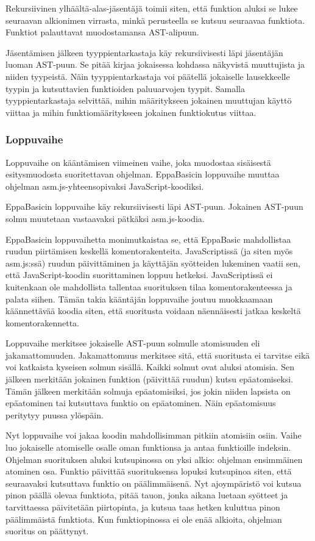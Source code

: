 Rekursiivinen ylhäältä-alas-jäsentäjä
toimii siten, että funktion aluksi
se lukee seuraavan alkionimen virrasta,
minkä perusteella se kutsuu seuraavaa
funktiota.
Funktiot palauttavat muodostamansa
AST-alipuun.

Jäsentämisen jälkeen tyyppientarkastaja
käy rekursiivisesti läpi jäsentäjän
luoman AST-puun.
Se pitää kirjaa jokaisessa kohdassa
näkyvistä muuttujista ja niiden tyypeistä.
Näin tyyppientarkastaja voi päätellä
jokaiselle lausekkeelle tyypin
ja kutsuttavien funktioiden
paluuarvojen tyypit.
Samalla tyyppientarkastaja selvittää,
mihin määritykseen jokainen muuttujan
käyttö viittaa ja mihin funktiomääritykseen
jokainen funktiokutus viittaa.

\subsubsection{Loppuvaihe}
Loppuvaihe on kääntämisen viimeinen vaihe,
joka muodostaa sisäisestä esitysmuodosta
suoritettavan ohjelman.
EppaBasicin loppuvaihe muuttaa ohjelman
asm.js-yhteensopivaksi \cite{asm.js}
JavaScript-koodiksi.

EppaBasicin loppuvaihe käy rekursiivisesti
läpi AST-puun.
Jokainen AST-puun solmu muutetaan
vastaavaksi pätkäksi asm.js-koodia.

EppaBasicin loppuvaihetta monimutkaistaa se,
että EppaBasic mahdollistaa ruudun piirtämisen
keskellä komentorakenteita.
JavaScriptissä (ja siten myös asm.js:ssä)
ruudun päivittäminen ja käyttäjän syötteiden
lukeminen vaatii sen, että JavaScript-koodin
suorittaminen loppuu hetkeksi.
JavaScriptissä ei kuitenkaan ole
mahdollista tallentaa suorituksen tilaa
komentorakenteessa ja palata siihen.
Tämän takia kääntäjän loppuvaihe
joutuu muokkaamaan käännettävää
koodia siten, että suoritusta
voidaan näennäisesti jatkaa
keskeltä komentorakennetta.

Loppuvaihe merkitsee jokaiselle
AST-puun solmulle atomisuuden
eli jakamattomuuden.
Jakamattomuus merkitsee sitä,
että suoritusta ei tarvitse eikä voi
katkaista kyseisen solmun sisällä.
Kaikki solmut ovat aluksi atomisia.
Sen jälkeen merkitään jokainen
funktion  (päivittää ruudun)
kutsu epäatomiseksi.
Tämän jälkeen merkitään solmuja
epäatomisiksi, jos jokin niiden
lapsista on epäatominen tai
kutsuttava funktio on epäatominen.
Näin epäatomisuus peritytyy
puussa ylöspäin.

Nyt loppuvaihe voi jakaa koodin
mahdollisimman pitkiin atomisiin osiin.
Vaihe luo jokaiselle atomiselle osalle oman
funktionsa ja antaa funktioille indeksin.
Ohjelman suorituksen aluksi kutsupinossa
on yksi alkio: ohjelman ensimmäinen
atominen osa.
Funktio päivittää suorituksensa
lopuksi kutsupinoa siten,
että seuraavaksi kutsuttava
funktio on päälimmäisenä.
Nyt ajoympäristö voi kutsua
pinon päällä olevaa funktiota,
pitää tauon, jonka aikana
luetaan syötteet ja tarvittaessa
päivitetään piirtopinta,
ja kutsua taas hetken kuluttua
pinon päälimmäistä funktiota.
Kun funktiopinossa ei ole
enää alkioita, ohjelman suoritus
on päättynyt.

